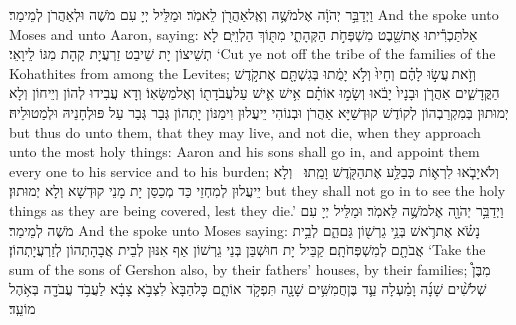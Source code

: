 {וַיְדַבֵּ֣ר יְהֹוָ֔ה אֶל\maqqaf מֹשֶׁ֥ה וְאֶֽל\maqqaf אַהֲרֹ֖ן לֵאמֹֽר׃}
{וּמַלֵּיל יְיָ עִם מֹשֶׁה וּלְאַהֲרֹן לְמֵימַר׃}
{And the \lord\space spoke unto Moses and unto Aaron, saying:}{}
{אַל\maqqaf תַּכְרִ֕יתוּ אֶת\maqqaf שֵׁ֖בֶט מִשְׁפְּחֹ֣ת הַקְּהָתִ֑י מִתּ֖וֹךְ הַלְוִיִּֽם׃}
{לָא תְשֵׁיצוֹן יָת שֵׁיבַט זַרְעֲיָת קְהָת מִגּוֹ לֵיוָאֵי׃}
{‘Cut ye not off the tribe of the families of the Kohathites from among the Levites;}{}
{וְזֹ֣את \legarmeh  עֲשׂ֣וּ לָהֶ֗ם וְחָיוּ֙ וְלֹ֣א יָמֻ֔תוּ בְּגִשְׁתָּ֖ם אֶת\maqqaf קֹ֣דֶשׁ הַקֳּדָשִׁ֑ים אַהֲרֹ֤ן וּבָנָיו֙ יָבֹ֔אוּ וְשָׂמ֣וּ אוֹתָ֗ם אִ֥ישׁ אִ֛ישׁ עַל\maqqaf עֲבֹדָת֖וֹ וְאֶל\maqqaf מַשָּׂאֽוֹ׃}
{וְדָא עֲבִידוּ לְהוֹן וְיֵיחוֹן וְלָא יְמוּתוּן בְּמִקְרַבְהוֹן לְקוֹדֶשׁ קוּדְשַׁיָּא אַהֲרֹן וּבְנוֹהִי יֵיעֲלוּן וִימַנּוֹן יָתְהוֹן גְּבַר גְּבַר עַל פּוּלְחָנֵיהּ וּלְמַטוּלֵיהּ׃}
{but thus do unto them, that they may live, and not die, when they approach unto the most holy things: Aaron and his sons shall go in, and appoint them every one to his service and to his burden;}{}
{וְלֹא\maqqaf יָבֹ֧אוּ לִרְא֛וֹת כְּבַלַּ֥ע אֶת\maqqaf הַקֹּ֖דֶשׁ וָמֵֽתוּ׃ \petucha }
{וְלָא יֵיעֲלוּן לְמִחְזֵי כַּד מְכַסַּן יָת מָנֵי קוּדְשָׁא וְלָא יְמוּתוּן׃}
{but they shall not go in to see the holy things as they are being covered, lest they die.’}{}
{וַיְדַבֵּ֥ר יְהֹוָ֖ה אֶל\maqqaf מֹשֶׁ֥ה לֵּאמֹֽר׃}
{וּמַלֵּיל יְיָ עִם מֹשֶׁה לְמֵימַר׃}
{And the \lord\space spoke unto Moses saying:}{}
{נָשֹׂ֗א אֶת\maqqaf רֹ֛אשׁ בְּנֵ֥י גֵרְשׁ֖וֹן גַּם\maqqaf הֵ֑ם לְבֵ֥ית אֲבֹתָ֖ם לְמִשְׁפְּחֹתָֽם׃}
{קַבֵּיל יָת חוּשְׁבַּן בְּנֵי גֵרְשׁוֹן אַף אִנּוּן לְבֵית אֲבָהָתְהוֹן לְזַרְעֲיָתְהוֹן׃}
{‘Take the sum of the sons of Gershon also, by their fathers’ houses, by their families;}{}
{מִבֶּן֩ שְׁלֹשִׁ֨ים שָׁנָ֜ה וָמַ֗עְלָה עַ֛ד בֶּן\maqqaf חֲמִשִּׁ֥ים שָׁנָ֖ה תִּפְקֹ֣ד אוֹתָ֑ם כׇּל\maqqaf הַבָּא֙ לִצְבֹ֣א צָבָ֔א לַעֲבֹ֥ד עֲבֹדָ֖ה בְּאֹ֥הֶל מוֹעֵֽד׃}
